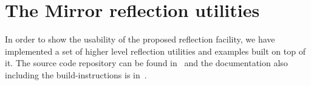 \section{The Mirror reflection utilities}
\label{mirror-lib}

In order to show the usability of the proposed reflection facility, we have
implemented a set of higher level reflection utilities and examples built
on top of it. The source code repository can be found
in~\cite{Chochlik-Mirror-new-repo} and the documentation also including
the build-instructions is in~\cite{Chochlik-Mirror-new-doc}.
